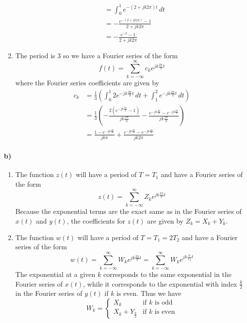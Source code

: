 \documentclass[12pt]{article}
\begin{document}
\begin{enumerate}
\begin{align*}
        &= \int_0^1 e^{-(2+jk2\pi)t}\, dt\\
        &=-\frac{e^{-(2+jk2\pi)}-1}{2+jk2\pi}\\
        &=-\frac{e^{-2}-1}{2+jk2\pi}
    \end{align*}
    \item The period is 3 so we have a Fourier series of the form
    \[f(t)=\sum_{k=-\infty}^\infty c_k e^{jk\frac{2\pi}{3} t}\]
    where the Fourier series coefficients are given by
    \begin{align*}
        c_k&=\frac{1}{3}\left(\int_0^1 2e^{-jk\frac{2\pi}{3} t}\, dt + \int_1^2 e^{-jk\frac{2\pi}{3} t}\, dt\right)\\
        &=\frac{1}{3}\left(-\frac{2(e^{-jk\frac{2\pi}{3}}-1)}{jk\frac{2\pi}{3}} -\frac{e^{-jk\frac{4\pi}{3}}-e^{-jk\frac{2\pi}{3}}}{jk\frac{2\pi}{3}}\right)\\
        &=\frac{1-e^{-jk\frac{2\pi}{3}}}{jk\pi}+\frac{e^{-jk\frac{2\pi}{3}}-e^{-jk\frac{4\pi}{3}}}{jk2\pi}
    \end{align*}
\end{enumerate}

\paragraph{b)}

\begin{enumerate}
    \item The function \(z(t)\) will have a period of \(T=T_1\) and have a Fourier series of the form
    \[z(t)=\sum_{k=-\infty}^\infty Z_k e^{jk\frac{2\pi}{T} t}\]
    Because the exponential terms are the exact same as in the Fourier series of \(x(t)\) and \(y(t)\), the coefficients for \(z(t)\) are given by \(Z_k=X_k+Y_k\).
    \item The function \(w(t)\) will have a period of \(T=T_1=2T_2\) and have a Fourier series of the form
    \[w(t)=\sum_{k=-\infty}^\infty W_k e^{jk\frac{2 \pi}{T} t}=\sum_{k=-\infty}^\infty W_k e^{jk\frac{\pi}{T_2} t}\]
    The exponential at a given \(k\) corresponds to the same exponential in the Fourier series of \(x(t)\), while it corresponds to the exponential with index \(\frac{k}{2}\) in the Fourier
    series of \(y(t)\) if \(k\) is even. Thus we have
    \[W_k=
        \begin{cases}
            X_k & \text{if }k\text{ is odd}\\
            X_k+Y_{\frac{k}{2}} & \text{if }k\text{ is even}
        \end{cases}
    \]
\end{enumerate}
\end{document}
